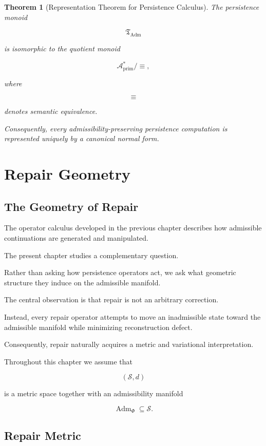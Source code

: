 \documentclass[11pt]{book}
\numberwithin{equation}{chapter}
\theoremstyle{definition}
\theoremstyle{plain}
\newtheorem{theorem}[definition]{Theorem}
\begin{document}
\begin{theorem}[Representation Theorem for Persistence Calculus]

The persistence monoid

\[
\mathfrak T_{\operatorname{Adm}}
\]

is isomorphic to the quotient monoid

\[
\mathcal A_{\mathrm{prim}}^*/
{\equiv},
\]

where

\[
\equiv
\]

denotes semantic equivalence.

Consequently, every admissibility-preserving persistence computation is
represented uniquely by a canonical normal form.

\end{theorem}

\chapter{Repair Geometry}

\section{The Geometry of Repair}

The operator calculus developed in the previous chapter describes how
admissible continuations are generated and manipulated.

The present chapter studies a complementary question.

Rather than asking how persistence operators act, we ask what geometric
structure they induce on the admissible manifold.

The central observation is that repair is not an arbitrary correction.

Instead, every repair operator attempts to move an inadmissible state
toward the admissible manifold while minimizing reconstruction defect.

Consequently, repair naturally acquires a metric and variational
interpretation.

Throughout this chapter we assume that

\[
(\mathcal S,d)
\]

is a metric space together with an admissibility manifold

\[
\operatorname{Adm}_{\Phi}
\subseteq
\mathcal S.
\]

\section{Repair Metric}
\end{document}
